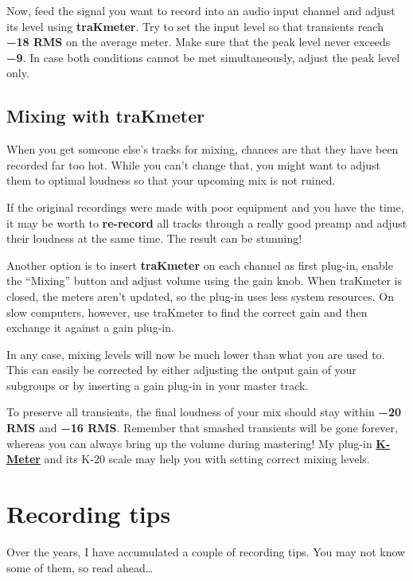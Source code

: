 Now, feed the signal you want to record into an audio input channel
and adjust its level using \textbf{traKmeter}.  Try to set the input
level so that transients reach \textbf{\SI{-18}{\dBFS} RMS} on the
average meter.  Make sure that the peak level never exceeds
\textbf{\SI{-9}{\dBFS}}.  In case both conditions cannot be met
simultaneously, adjust the peak level only.

\section{Mixing with traKmeter}
\label{sec:mixing_with_trakmeter}

When you get someone else's tracks for mixing, chances are that they
have been recorded far too hot.  While you can't change that, you
might want to adjust them to optimal loudness so that your upcoming
mix is not ruined.

If the original recordings were made with poor equipment and you have
the time, it may be worth to \textbf{re-record} all tracks through a
really good preamp and adjust their loudness at the same time.  The
result can be stunning!

Another option is to insert \textbf{traKmeter} on each channel as
first plug-in, enable the ``Mixing'' button and adjust volume using
the gain knob.  When traKmeter is closed, the meters aren't updated,
so the plug-in uses less system resources.  On slow computers,
however, use traKmeter to find the correct gain and then exchange it
against a gain plug-in.

In any case, mixing levels will now be much lower than what you are
used to.  This can easily be corrected by either adjusting the output
gain of your subgroups or by inserting a gain plug-in in your master
track.

To preserve all transients, the final loudness of your mix should stay
within \textbf{\SI{-20}{\dBFS} RMS} and \textbf{\SI{-16}{\dBFS} RMS}.
Remember that smashed transients will be gone forever, whereas you can
always bring up the volume during mastering!  My plug-in
\href{http://code.mzuther.de/}{\textbf{K-Meter}} and its K-20 scale
may help you with setting correct mixing levels.

\chapter{Recording tips}
\label{chap:recording_tips}

Over the years, I have accumulated a couple of recording tips.  You
may not know some of them, so read ahead\dots


